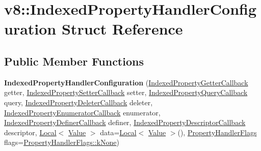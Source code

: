 \hypertarget{structv8_1_1IndexedPropertyHandlerConfiguration}{}\section{v8\+:\+:Indexed\+Property\+Handler\+Configuration Struct Reference}
\label{structv8_1_1IndexedPropertyHandlerConfiguration}
\subsection*{Public Member Functions}
\begin{DoxyCompactItemize}
\item 
\mbox{\label{structv8_1_1IndexedPropertyHandlerConfiguration_a4c66c201ea6884e34c7ff2605eef5403}} 
{\bfseries Indexed\+Property\+Handler\+Configuration} (\mbox{\hyperlink{namespacev8_a48e7816ba64447bf32a25d194588daaf}{Indexed\+Property\+Getter\+Callback}} getter, \mbox{\hyperlink{namespacev8_a4ac7cc6185ebc8b6a199f9fa8e6bf5c3}{Indexed\+Property\+Setter\+Callback}} setter, \mbox{\hyperlink{namespacev8_a980b62c33eb664783e61e25c3b27f9ee}{Indexed\+Property\+Query\+Callback}} query, \mbox{\hyperlink{namespacev8_a53863728de14cde48dd6543207b2f2da}{Indexed\+Property\+Deleter\+Callback}} deleter, \mbox{\hyperlink{namespacev8_adbb0a6d5537371953f9ba807d4f6275e}{Indexed\+Property\+Enumerator\+Callback}} enumerator, \mbox{\hyperlink{namespacev8_a967435db933fa9798caac467948499df}{Indexed\+Property\+Definer\+Callback}} definer, \mbox{\hyperlink{namespacev8_a7506e91d70d885b5cbeabdf870ac0e88}{Indexed\+Property\+Descriptor\+Callback}} descriptor, \mbox{\hyperlink{classv8_1_1Local}{Local}}$<$ \mbox{\hyperlink{classv8_1_1Value}{Value}} $>$ data=\mbox{\hyperlink{classv8_1_1Local}{Local}}$<$ \mbox{\hyperlink{classv8_1_1Value}{Value}} $>$(), \mbox{\hyperlink{namespacev8_af4789f0aeb8680e353901a35810cac1a}{Property\+Handler\+Flags}} flags=\mbox{\hyperlink{namespacev8_af4789f0aeb8680e353901a35810cac1aa35c3ace1970663a16e5c65baa5941b13}{Property\+Handler\+Flags\+::k\+None}})
\item 

\end{DoxyCompactItemize}
